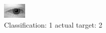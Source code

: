 \begin{figure}[h!]
\begin{center}
\includegraphics[width=0.60\columnwidth]{figures/ID474_class_1_target_2.png}
\end{center}
\caption{ Classification: 1 actual target: 2}
\label{fig:ID474_class_1_target_2}
\end{figure}
